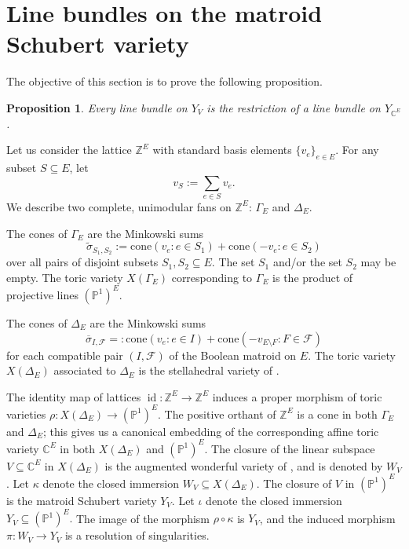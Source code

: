 \documentclass{amsart}
\theoremstyle{plain}
\newtheorem{proposition}[theorem]{Proposition}
\theoremstyle{definition}
\newcommand{\id}{\operatorname{id}}
\begin{document}
\section{Line bundles on the matroid Schubert variety}
\label{sec:line_bundles}

The objective of this section is to prove the following proposition.

\begin{proposition}
\label{prop:line_bundles}
    Every line bundle on $Y_V$ is the restriction of a line bundle on $Y_{\mathbb{C}^E}$.
\end{proposition}

Let us consider the lattice $\mathbb{Z}^E$ with standard basis elements $\{v_e\}_{e\in E}$. For any subset $S \subseteq E$, let
\[v_S :=\sum_{e\in S}v_e.\]
We describe two complete, unimodular fans on $\mathbb{Z}^E$: $\Gamma_E$ and $\Delta_{E}$.

The cones of $\Gamma_{E}$ are the Minkowski sums
\[\tilde{\sigma}_{S_1,S_2} := \text{cone}(v_e : e \in S_1) + \text{cone}(-v_e : e \in S_2)\]
over all pairs of disjoint subsets $S_1,S_2 \subseteq E.$ The set $S_1$ and/or the set $S_2$ may be empty. The toric variety $X(\Gamma_E)$ corresponding to $\Gamma_E$ is the product of projective lines $(\mathbb{P}^1)^E$.

The cones of $\Delta_{E}$ are the Minkowski sums
\[\overline{\sigma}_{I,\mathscr{F}} =:\text{cone}(v_e : e \in I) + \text{cone}\left(-v_{E \setminus F} : F \in \mathscr{F}\right)\]
for each compatible pair $(I, \mathscr{F})$ of the Boolean matroid on $E$. The toric variety $X(\Delta_E)$ associated to $\Delta_E$ is the stellahedral variety of \cite{stellahedral}.

The identity map of lattices $\id:\mathbb{Z}^E \to \mathbb{Z}^E$ induces a proper morphism of toric varieties $\rho:X(\Delta_E) \to (\mathbb{P}^1)^E$. The positive orthant of $\mathbb{Z}^E$ is a cone in both $\Gamma_E$ and $\Delta_{E}$; this gives us a canonical embedding of the corresponding affine toric variety $\mathbb{C}^E$ in both $X(\Delta_E)$ and $(\mathbb{P}^1)^E.$ The closure of the linear subspace $V \subseteq \mathbb{C}^E$ in $X(\Delta_E)$ is the augmented wonderful variety of \cite{semismall}, and is denoted by $W_V$. Let $\kappa$ denote the closed immersion $W_V \subseteq X(\Delta_E).$ The closure of $V$ in $(\mathbb{P}^1)^E$ is the matroid Schubert variety $Y_V$. Let $\iota$ denote the closed immersion $Y_V \subseteq (\mathbb{P}^1)^E.$ The image of the morphism $\rho \circ \kappa$ is $Y_V$, and the induced morphism $\pi: W_V \to Y_V$ is a resolution of singularities.
\end{document}
